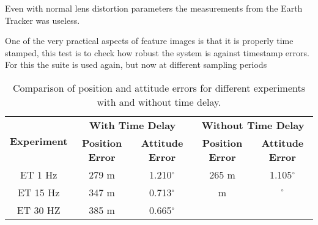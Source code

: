 Even with normal lens distortion parameters the measurements from the Earth Tracker was useless.

\label{sec:DistortionTest}

One of the very practical aspects of feature images is that it is properly time stamped, this test is to check how robust the system is against timestamp errors.
For this the suite is used again, but now at different sampling periods




\begin{table}[H]
\centering
\begin{tabular}{|c|c|c|c|c|}
\hline
\multirow{2}{*}{\textbf{Experiment}} & \multicolumn{2}{c|}{\textbf{With Time Delay}} & \multicolumn{2}{c|}{\textbf{Without Time Delay}} \\ \cline{2-5}
 & \textbf{Position Error} & \textbf{Attitude Error} & \textbf{Position Error} & \textbf{Attitude Error} \\ \hline
ET 1 Hz & 279 m & 1.210$^{\circ}$ & 265 m & 1.105$^{\circ}$ \\ \hline
ET 15 Hz & 347 m & 0.713$^{\circ}$ &  m & $^{\circ}$ \\ \hline
ET 30 HZ & 385 m & 0.665$^{\circ}$ & 
\end{tabular}
\caption{Comparison of position and attitude errors for different experiments with and without time delay.}
\label{tab:experiment_errors}
\end{table}


\label{sec:expcon}